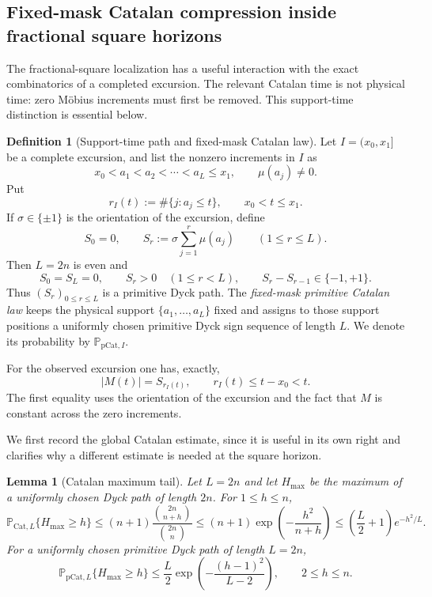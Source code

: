 \documentclass[11pt]{amsart}
\numberwithin{equation}{section}
\theoremstyle{plain}
\newtheorem{lemma}[theorem]{Lemma}
\theoremstyle{definition}
\newtheorem{definition}[theorem]{Definition}
\theoremstyle{remark}
\begin{document}
\subsection{Fixed-mask Catalan compression inside fractional square horizons}
\label{subsec:catalan-square}

The fractional-square localization has a useful interaction with the exact
combinatorics of a completed excursion.  The relevant Catalan time is not
physical time: zero M\"obius increments must first be removed.  This
support-time distinction is essential below.

\begin{definition}[Support-time path and fixed-mask Catalan law]
\label{def:support-catalan}
Let $I=(x_0,x_1]$ be a complete excursion, and list the nonzero increments in
$I$ as
\[
 x_0<a_1<a_2<\cdots<a_L\le x_1,
 \qquad \mu(a_j)\ne0.
\]
Put
\[
 r_I(t):=\#\{j:a_j\le t\},\qquad x_0<t\le x_1.
\]
If $\sigma\in\{\pm1\}$ is the orientation of the excursion, define
\[
 S_0=0,\qquad
 S_r:=\sigma\sum_{j=1}^r\mu(a_j)\qquad(1\le r\le L).
\]
Then $L=2n$ is even and
\[
 S_0=S_L=0,\qquad S_r>0\quad(1\le r<L),\qquad
 S_r-S_{r-1}\in\{-1,+1\}.
\]
Thus $(S_r)_{0\le r\le L}$ is a primitive Dyck path.  The
\emph{fixed-mask primitive Catalan law} keeps the physical support
$\{a_1,\dots,a_L\}$ fixed and assigns to those support positions a uniformly
chosen primitive Dyck sign sequence of length $L$.  We denote its probability
by $\mathbb P_{\mathrm{pCat},I}$.
\end{definition}

For the observed excursion one has, exactly,
\begin{equation}
\label{eq:support-time-height}
 |M(t)|=S_{r_I(t)},
 \qquad
 r_I(t)\le t-x_0<t.
\end{equation}
The first equality uses the orientation of the excursion and the fact that
$M$ is constant across the zero increments.

We first record the global Catalan estimate, since it is useful in its own
right and clarifies why a different estimate is needed at the square
horizon.

\begin{lemma}[Catalan maximum tail]
\label{lem:catalan-max-tail}
Let $L=2n$ and let $H_{\max}$ be the maximum of a uniformly chosen Dyck path
of length $2n$.  For $1\le h\le n$,
\begin{equation}
\label{eq:catalan-max-tail}
 \mathbb P_{\mathrm{Cat},L}\{H_{\max}\ge h\}
 \le (n+1)\frac{\binom{2n}{n+h}}{\binom{2n}{n}}
 \le (n+1)\exp\!\left(-\frac{h^2}{n+h}\right)
 \le \left(\frac L2+1\right)e^{-h^2/L}.
\end{equation}
For a uniformly chosen primitive Dyck path of length $L=2n$,
\begin{equation}
\label{eq:primitive-catalan-max-tail}
 \mathbb P_{\mathrm{pCat},L}\{H_{\max}\ge h\}
 \le \frac L2\exp\!\left(-\frac{(h-1)^2}{L-2}\right),
 \qquad 2\le h\le n.
\end{equation}
\end{lemma}
\end{document}
